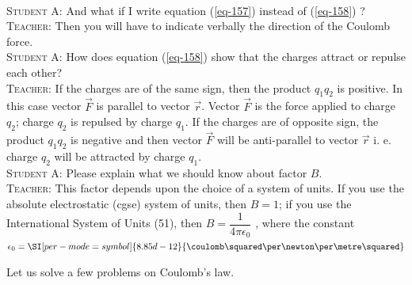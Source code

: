 \documentclass[a4paper,sfsidenotes]{tufte-book}
\begin{document}
\\
\textsc{Student A:} And what if I write equation (\ref{eq-157}) instead of (\ref{eq-158}) ?
\\
\textsc{Teacher:} Then you will have to indicate verbally the direction of the Coulomb force.
\\
\textsc{Student A:} How does equation (\ref{eq-158}) show that the charges attract or repulse each other?
\\
\textsc{Teacher:} If the charges are of the same sign, then the product $q_{1}q_{2}$ is positive. In this case vector $\vec{F}$ is parallel to vector $\vec{r}$. Vector $\vec{F}$ is the force applied to charge $q_{2}$; charge $q_{2}$ is repulsed by charge $q_{1}$. If the charges are of opposite sign, the product $q_{1}q_{2}$ is negative and then vector $\vec{F}$ will be anti-parallel to vector $\vec{r}$ i. e. charge $q_{2}$ will be attracted by charge $q_{1}$.
\\
\textsc{Student A:} Please explain what we should know about factor $B$.
\\
\textsc{Teacher:} This factor depends upon the choice of a system of units. If you use the absolute electrostatic (cgse) system of units, then $B=1$; if you use the International System of Units (51), then $B=\dfrac{1}{4 \pi \epsilon_{0}}$ , where the constant $\epsilon_{0} = \SI[per-mode=symbol]{8.85d-12}{\coulomb \squared \per \newton \per \metre \squared}$%

Let us solve a few problems on Coulomb's law.
\end{document}
